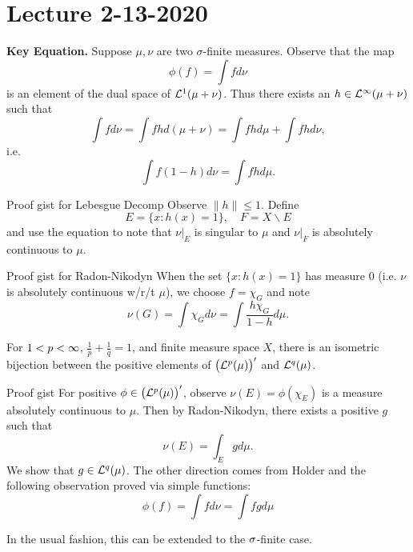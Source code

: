 \section{Lecture 2-13-2020}
\textbf{Key Equation.} Suppose $\mu, \nu$ are two $\sigma$-finite measures. Observe that the map
\[
    \phi(f) = \int f d\nu
\]
is an element of the dual space of ${\mathcal L}^1(\mu + \nu)$. Thus there exists an $h \in {\mathcal L}^\infty(\mu + \nu)$ such that
\[
    \int f d\nu = \int fh d(\mu + \nu) = \int fh d\mu + \int fh d\nu,
\]
i.e.
\[
    \int f(1-h) d\nu = \int fh d\mu.
\]
\begin{details}{Proof gist for Lebesgue Decomp}
Observe $\|h\| \leq 1$. Define
\[
    E = \{x : h(x) = 1\}, \quad F = X\backslash E
\]
and use the equation to note that $\nu|_E$ is singular to $\mu$ and $\nu|_F$ is absolutely continuous to $\mu$.
\end{details}

\begin{details}{Proof gist for Radon-Nikodyn}
When the set $\{x : h(x) = 1\}$ has measure 0 (i.e. $\nu$ is absolutely continuous w/r/t $\mu$), we choose $f = \chi_G$ and note
\[
    \nu(G) = \int \chi_G d \nu = \int \frac{h\chi_G}{1 - h} d\mu.
\]
\end{details}

\begin{thm}
For $1 < p < \infty$, $ \frac{1}{p} + \frac{1}{q} = 1$, and finite measure space $X$, there is an isometric bijection between the positive elements of $\big({\mathcal L}^p(\mu)\big)'$ and ${\mathcal L}^{q}(\mu)$.
\end{thm}
\begin{details}{Proof gist}
For positive $\phi \in \big({\mathcal L}^p(\mu)\big)'$, observe $\nu(E) = \phi(\chi_E)$ is a measure absolutely continuous to $\mu$. Then by Radon-Nikodyn, there exists a positive $g$ such that
\[
    \nu(E) = \int_E g d\mu.
\]
We show that $g \in {\mathcal L}^{q}(\mu)$. The other direction comes from Holder and the following observation proved via simple functions:
\[
    \phi(f) = \int f d\nu = \int fg d\mu
\]
\end{details}
\begin{remark}
In the usual fashion, this can be extended to the $\sigma$-finite case.
\end{remark}

